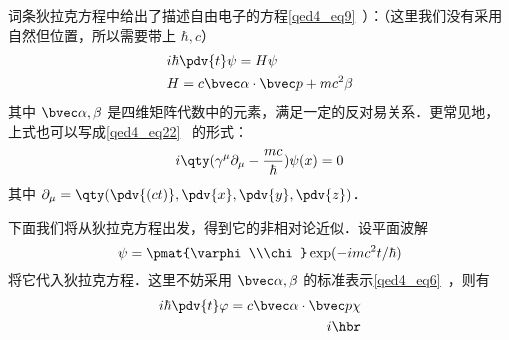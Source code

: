 

词条狄拉克方程中给出了描述自由电子的方程\autoref{qed4_eq9}~）：（这里我们没有采用自然但位置，所以需要带上 $\hbar,c$）
\begin{equation}
\begin{aligned}
&i\hbar \pdv{t} \psi = H\psi\\
&H=c\bvec \alpha\cdot \bvec p+mc^2\beta
\end{aligned}
\end{equation}
其中 $\bvec \alpha,\beta$ 是四维矩阵代数中的元素，满足一定的反对易关系．更常见地，上式也可以写成\autoref{qed4_eq22}~ 的形式：
\begin{equation}
i\qty(\gamma^\mu \partial_\mu-\frac{mc}{\hbar})\psi(x)=0
\end{equation}
其中 $\partial_\mu=\qty(\pdv{(ct)},\pdv{x},\pdv{y},\pdv{z})$．

下面我们将从狄拉克方程出发，得到它的非相对论近似．设平面波解
\begin{equation}
\psi=\pmat{\varphi\\\chi}\exp(-imc^2t/\hbar)
\end{equation}
将它代入狄拉克方程．这里不妨采用 $\bvec \alpha,\beta$ 的标准表示\autoref{qed4_eq6}~，则有
\begin{equation}
\begin{aligned}
i\hbar\pdv{t} \varphi=c\bvec \alpha\cdot \bvec p \chi\\
i\hbr
\end{aligned}
\end{equation}
